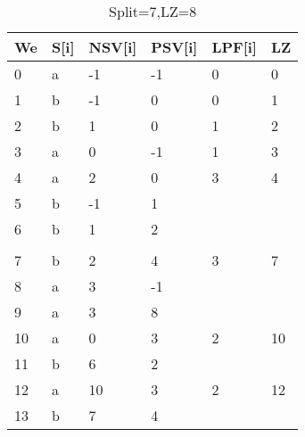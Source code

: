 \begin{table}[h]
\centering
\begin{tabular}{@{}llllll@{}}
\toprule
We  & S{[}i{]} & NSV{[}i{]} & PSV{[}i{]} & LPF{[}i{]} & LZ \\ \midrule
0  & a        & -1         & -1         & 0          & 0  \\
1  & b        & -1         & 0          & 0          & 1  \\
2  & b        & 1          & 0          & 1          & 2  \\
3  & a        & 0          & -1         & 1          & 3  \\
4  & a        & 2          & 0          & 3          & 4  \\
5  & b        & -1         & 1          &            &    \\
6  & b        & 1          & 2          &            &    \\
   &          &            &            &            &    \\
7  & b        & 2          & 4          & 3          & 7  \\
8  & a        & 3          & -1         &            &    \\
9  & a        & 3          & 8          &            &    \\
10 & a        & 0          & 3          & 2          & 10 \\
11 & b        & 6          & 2          &            &    \\
12 & a        & 10         & 3          & 2          & 12 \\
13 & b        & 7          & 4          &            &    \\ \bottomrule
\end{tabular}
\caption{Split=7,LZ=8}
\label{tab:example7}
\end{table}

